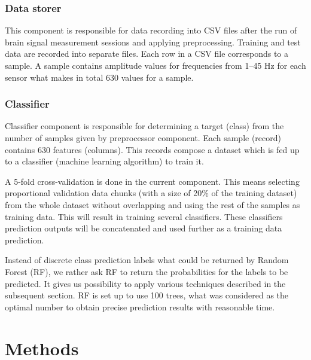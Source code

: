 \documentclass[12pt]{article}
\theoremstyle{definition}
\begin{document}
\subsubsection{Data storer}

This component is responsible for data recording into CSV files after the run of brain signal measurement sessions and applying preprocessing. Training and test data are recorded into separate files. Each row in a CSV file corresponds to a sample. A sample contains amplitude values for frequencies from 1--45 Hz for each sensor what makes in total 630 values for a sample. 

\subsubsection{Classifier}

Classifier component is responsible for determining a target (class) from the number of samples given by preprocessor component. Each sample (record) contains 630 features (columns). This records compose a dataset which is fed up to a classifier (machine learning algorithm) to train it. 

A 5-fold cross-validation is done in the current component. This means selecting proportional validation data chunks (with a size of 20\% of the training dataset) from the whole dataset without overlapping and using the rest of the samples as training data. This will result in training several classifiers. These classifiers prediction outputs will be concatenated and used further as a training data prediction.

Instead of discrete class prediction labels what could be returned by Random Forest (RF), we rather ask RF to return the probabilities for the labels to be predicted. It gives us possibility to apply various techniques described in the subsequent section. RF is set up to use 100 trees, what was considered as the optimal number to obtain precise prediction results with reasonable time.

\newpage
\section{Methods} \label{methods}
\end{document}
